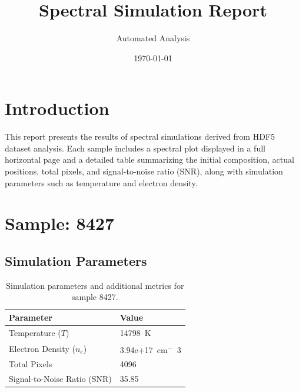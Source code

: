 \documentclass[a4paper,11pt]{article}
\title{Spectral Simulation Report}
\author{Automated Analysis}
\date{\today}
\begin{document}
\maketitle
\tableofcontents
\clearpage

\section{Introduction}
This report presents the results of spectral simulations derived from HDF5 dataset analysis. Each sample includes a spectral plot displayed in a full horizontal page and a detailed table summarizing the initial composition, actual positions, total pixels, and signal-to-noise ratio (SNR), along with simulation parameters such as temperature and electron density.


\section{Sample: 8427}
\subsection{Simulation Parameters}
\begin{table}[h!]
    \centering
    \begin{tabular}{ll}
        \toprule
        \textbf{Parameter} & \textbf{Value} \\
        \midrule
        Temperature ($T$) & 14798 \,\si{K} \\
        Electron Density ($n_e$) & 3.94e+17 \,\si{cm^-3} \\
        Total Pixels & 4096 \\
        Signal-to-Noise Ratio (SNR) & 35.85 \\
        \bottomrule
    \end{tabular}
    \caption{Simulation parameters and additional metrics for sample 8427.}
    \label{tab:params_8427}
\end{table}
\end{document}

